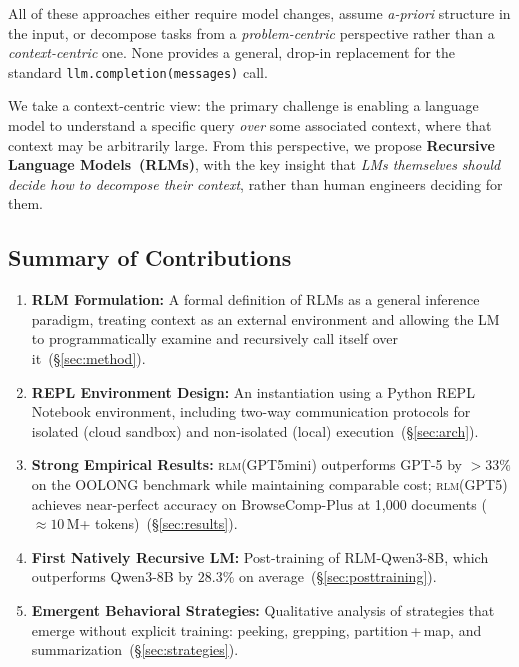 \documentclass[journal, 10pt, letterpaper]{IEEEtran}
\newcommand{\RLM}[1]{\textsc{rlm}(#1)}
\newcommand{\code}[1]{\texttt{#1}}
\begin{document}
All of these approaches either require model changes, assume \emph{a-priori}
structure in the input, or decompose tasks from a \emph{problem-centric}
perspective rather than a \emph{context-centric} one.  None provides a
general, drop-in replacement for the standard \code{llm.completion(messages)}
call.

We take a context-centric view: the primary challenge is enabling a language
model to understand a specific query \emph{over} some associated context,
where that context may be arbitrarily large.  From this perspective, we
propose \textbf{Recursive Language Models~(RLMs)}, with the key insight that
\emph{LMs themselves should decide how to decompose their context}, rather
than human engineers deciding for them.

\subsection*{Summary of Contributions}

\begin{enumerate}
  \item \textbf{RLM Formulation:} A formal definition of RLMs as a general
    inference paradigm, treating context as an external environment and
    allowing the LM to programmatically examine and recursively call itself
    over it~(\S\ref{sec:method}).
  \item \textbf{REPL Environment Design:} An instantiation using a Python REPL
    Notebook environment, including two-way communication protocols for
    isolated (cloud sandbox) and non-isolated (local) execution~(\S\ref{sec:arch}).
  \item \textbf{Strong Empirical Results:} \RLM{GPT\text{-}5\text{-}mini}
    outperforms GPT-5 by $>33\%$ on the OOLONG benchmark while maintaining
    comparable cost; \RLM{GPT\text{-}5} achieves near-perfect accuracy on
    BrowseComp-Plus at 1{,}000 documents ($\approx 10\,$M+ tokens)~(\S\ref{sec:results}).
  \item \textbf{First Natively Recursive LM:} Post-training of
    RLM-Qwen3-8B, which outperforms Qwen3-8B by $28.3\%$ on
    average~(\S\ref{sec:posttraining}).
  \item \textbf{Emergent Behavioral Strategies:} Qualitative analysis of
    strategies that emerge without explicit training: peeking, grepping,
    partition\,+\,map, and summarization~(\S\ref{sec:strategies}).
\end{enumerate}

\end{document}
